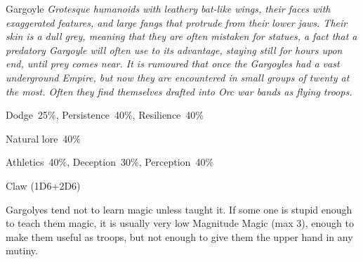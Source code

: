 \newpage

\begin{monsterbox}{Gargoyle}
	\textit{Grotesque humanoids with leathery bat-like wings, their faces with exaggerated features, and large fangs that protrude from their lower jaws. Their skin is a dull grey, meaning that they are often mistaken for statues, a fact that a predatory Gargoyle will often use to its advantage, staying still for hours upon end, until prey comes near. It is rumoured that once the Gargoyles had a vast underground Empire, but now they are encountered in small groups of twenty at the most. Often they find themselves drafted into Orc war bands as flying troops.}\\
	\rpghline
	\basics[%
        hitpoints  = 14,
	majorwound = 7,
	damagemodifier = +2D6,
	powerpoints = 11,
	movementrate = {15m, 23m flying},
	armor = Tough Hide (6AP),
	plunderrating = 0
	]
	\rpghline%
	\stats[ %
		STR = 5D6+12 (29),
		CON = 3D6    (11),
		DEX = 3D6    (11),
		SIZ = 5D6    (17),
		INT = 1D6    (4),
		POW = 3D6    (11),
		CHA = 1D6    (4)
	]
	\rpghline%
	\begin{rpg-monsteraction}[Resistances]
		Dodge~25\%, Persistence~40\%, Resilience~40\%
	\end{rpg-monsteraction}
	\begin{rpg-monsteraction}[Knowledge]
    		Natural lore~40\%
	\end{rpg-monsteraction}
	\begin{rpg-monsteraction}[Practical]
		Athletics~40\%, Deception~30\%, Perception~40\%
	\end{rpg-monsteraction}
	\begin{rpg-monsteraction}
		Claw (1D6+2D6)
	\end{rpg-monsteraction}
	\begin{rpg-monsteraction}[Supernatural]
		Gargolyes tend not to learn magic unless taught it. If some one is stupid enough to teach them magic, it is usually very low Magnitude Magic (max 3), enough to make them useful as troops, but not enough to give them the upper hand in any mutiny.
	\end{rpg-monsteraction}

\end{monsterbox}

\newpage



